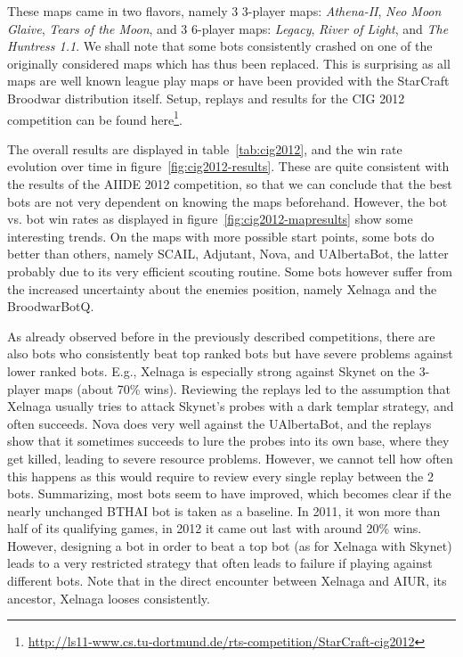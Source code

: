 \documentclass[journal]{IEEEtran}
\begin{document}
These maps came in two flavors, namely 3 3-player maps:
\emph{Athena-II}, \emph{Neo Moon Glaive}, \emph{Tears of the Moon},
and 3 6-player maps:
\emph{Legacy}, \emph{River of Light}, and 
\emph{The Huntress 1.1}. 
We shall note that some bots consistently crashed on one
of the originally considered maps which has thus been replaced.
This is surprising as all maps are well known league play maps
or have been provided with the StarCraft Broodwar distribution
itself.
Setup, replays and results for the CIG 2012 competition can be found
here\footnote{\url{http://ls11-www.cs.tu-dortmund.de/rts-competition/StarCraft-cig2012}}.

The overall results are displayed in table~\ref{tab:cig2012},
and the win rate evolution over time in figure~\ref{fig:cig2012-results}.
These are quite consistent with the results of the AIIDE 2012 competition,
so that we can conclude that the best bots are not very dependent on 
knowing the maps beforehand. However, the bot vs. bot win rates as
displayed in figure~\ref{fig:cig2012-mapresults} show some interesting
trends. On the maps with more possible start points, some bots do 
better than others, namely SCAIL, Adjutant, Nova, and UAlbertaBot,
the latter probably due to its very efficient scouting routine.
Some bots however suffer from the increased uncertainty about
the enemies position, namely Xelnaga and the BroodwarBotQ.

As already observed before in the previously described competitions,
there are also bots who consistently beat top ranked bots but have
severe problems against lower ranked bots. E.g., Xelnaga is especially
strong against Skynet on the 3-player maps (about 70\% wins). Reviewing
the replays led to the assumption that Xelnaga usually tries to attack
Skynet's probes with a dark templar strategy, and often succeeds. 
Nova does very well against the UAlbertaBot, and the replays show
that it sometimes succeeds to lure the probes into its own base, where
they get killed, leading to severe resource problems. However, we cannot
tell how often this happens as this would require to review every single
replay between the 2 bots. Summarizing, most bots seem to have improved,
which becomes clear if the nearly unchanged BTHAI bot is taken as a baseline.
In 2011, it won more than half of its qualifying games, in 2012 it came
out last with around 20\% wins. However, designing a bot in order to 
beat a top bot (as for Xelnaga with Skynet) leads to a very restricted
strategy that often leads to failure if playing against different bots.
Note that in the direct encounter between Xelnaga and AIUR, its ancestor,
Xelnaga looses consistently.
\end{document}
